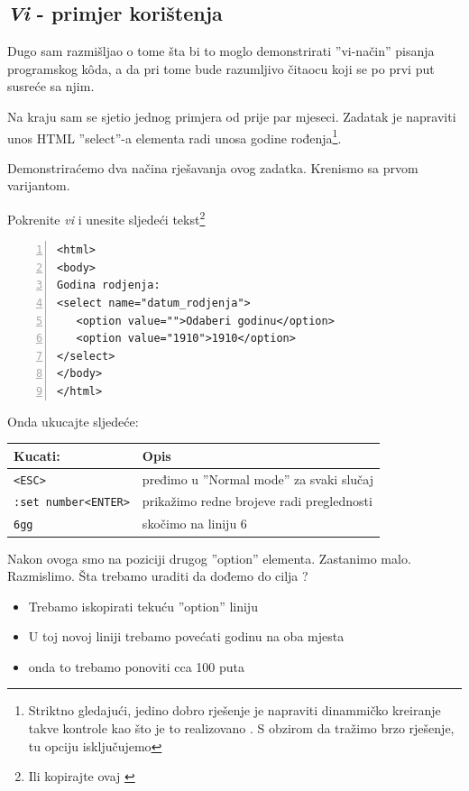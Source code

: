 \documentclass[times, utf8, seminar]{fit}
\begin{document}
\subsection{\emph{Vi} - primjer korištenja}

Dugo sam razmišljao o tome šta bi to moglo demonstrirati ''vi-način'' pisanja programskog k\^oda, a da pri tome bude razumljivo čitaocu koji se po prvi put susreće sa njim.

Na kraju sam se sjetio jednog primjera od prije par mjeseci. Zadatak je napraviti unos HTML ''select''-a elementa radi unosa godine rođenja\footnote{Striktno gledajući, jedino dobro rješenje je napraviti dinammičko kreiranje takve kontrole kao što je to realizovano \href{https://github.com/hernad/FIT\_WT/blob/master/09\_2012/util.js\#L9}{\color{blue}{ovdje}}. S obzirom da tražimo brzo rješenje, tu opciju isključujemo}.

Demonstriraćemo dva načina rješavanja ovog zadatka. Krenismo sa prvom varijantom.

Pokrenite \emph{vi} i unesite sljedeći tekst\footnote{Ili kopirajte ovaj \href{https://gist.github.com/raw/4412263/1e751a7305ab75823689cfb7654304337f75336e/gistfile1.txt}{\color{blue}{gist}}}
\begin{lstlisting}[numbers=left]
<html>
<body>
Godina rodjenja:
<select name="datum_rodjenja">
   <option value="">Odaberi godinu</option>
   <option value="1910">1910</option>
</select>
</body>
</html>
\end{lstlisting}

Onda ukucajte sljedeće:

\begin{center}
\begin{tabular}{ l | l }
  \hline                        
   Kucati:    &  Opis \\ 
   \hline
   \verb+<ESC>+     & pređimo u ''Normal mode'' za svaki slučaj \\
   \verb+:set number<ENTER>+ &  prikažimo redne brojeve radi preglednosti \\
   \verb+6gg+    & skočimo na liniju 6 \\
   \hline
\end{tabular}
\end{center}

Nakon ovoga smo na poziciji drugog ''option'' elementa. Zastanimo malo. Razmislimo. Šta trebamo uraditi da dođemo do cilja ? 
\begin{itemize}
  \item Trebamo iskopirati tekuću ''option'' liniju
  \item U toj novoj liniji trebamo povećati godinu na oba mjesta
  \item onda to trebamo ponoviti cca 100 puta
\end{itemize}
\end{document}
